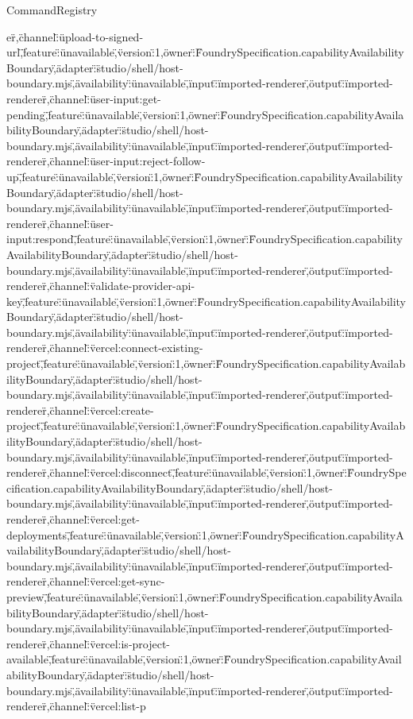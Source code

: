 \begin{lexlean}{CommandRegistry}
\begin{semanticmodule}
{er\"},{\"channel\":\"upload-to-signed-url\",\"feature\":\"unavailable\",\"version\":1,\"owner\":\"FoundrySpecification.capabilityAvailabilityBoundary\",\"adapter\":\"studio/shell/host-boundary.mjs\",\"availability\":\"unavailable\",\"input\":\"imported-renderer\",\"output\":\"imported-renderer\"},{\"channel\":\"user-input:get-pending\",\"feature\":\"unavailable\",\"version\":1,\"owner\":\"FoundrySpecification.capabilityAvailabilityBoundary\",\"adapter\":\"studio/shell/host-boundary.mjs\",\"availability\":\"unavailable\",\"input\":\"imported-renderer\",\"output\":\"imported-renderer\"},{\"channel\":\"user-input:reject-follow-up\",\"feature\":\"unavailable\",\"version\":1,\"owner\":\"FoundrySpecification.capabilityAvailabilityBoundary\",\"adapter\":\"studio/shell/host-boundary.mjs\",\"availability\":\"unavailable\",\"input\":\"imported-renderer\",\"output\":\"imported-renderer\"},{\"channel\":\"user-input:respond\",\"feature\":\"unavailable\",\"version\":1,\"owner\":\"FoundrySpecification.capabilityAvailabilityBoundary\",\"adapter\":\"studio/shell/host-boundary.mjs\",\"availability\":\"unavailable\",\"input\":\"imported-renderer\",\"output\":\"imported-renderer\"},{\"channel\":\"validate-provider-api-key\",\"feature\":\"unavailable\",\"version\":1,\"owner\":\"FoundrySpecification.capabilityAvailabilityBoundary\",\"adapter\":\"studio/shell/host-boundary.mjs\",\"availability\":\"unavailable\",\"input\":\"imported-renderer\",\"output\":\"imported-renderer\"},{\"channel\":\"vercel:connect-existing-project\",\"feature\":\"unavailable\",\"version\":1,\"owner\":\"FoundrySpecification.capabilityAvailabilityBoundary\",\"adapter\":\"studio/shell/host-boundary.mjs\",\"availability\":\"unavailable\",\"input\":\"imported-renderer\",\"output\":\"imported-renderer\"},{\"channel\":\"vercel:create-project\",\"feature\":\"unavailable\",\"version\":1,\"owner\":\"FoundrySpecification.capabilityAvailabilityBoundary\",\"adapter\":\"studio/shell/host-boundary.mjs\",\"availability\":\"unavailable\",\"input\":\"imported-renderer\",\"output\":\"imported-renderer\"},{\"channel\":\"vercel:disconnect\",\"feature\":\"unavailable\",\"version\":1,\"owner\":\"FoundrySpecification.capabilityAvailabilityBoundary\",\"adapter\":\"studio/shell/host-boundary.mjs\",\"availability\":\"unavailable\",\"input\":\"imported-renderer\",\"output\":\"imported-renderer\"},{\"channel\":\"vercel:get-deployments\",\"feature\":\"unavailable\",\"version\":1,\"owner\":\"FoundrySpecification.capabilityAvailabilityBoundary\",\"adapter\":\"studio/shell/host-boundary.mjs\",\"availability\":\"unavailable\",\"input\":\"imported-renderer\",\"output\":\"imported-renderer\"},{\"channel\":\"vercel:get-sync-preview\",\"feature\":\"unavailable\",\"version\":1,\"owner\":\"FoundrySpecification.capabilityAvailabilityBoundary\",\"adapter\":\"studio/shell/host-boundary.mjs\",\"availability\":\"unavailable\",\"input\":\"imported-renderer\",\"output\":\"imported-renderer\"},{\"channel\":\"vercel:is-project-available\",\"feature\":\"unavailable\",\"version\":1,\"owner\":\"FoundrySpecification.capabilityAvailabilityBoundary\",\"adapter\":\"studio/shell/host-boundary.mjs\",\"availability\":\"unavailable\",\"input\":\"imported-renderer\",\"output\":\"imported-renderer\"},{\"channel\":\"vercel:list-p}
\end{semanticmodule}
\end{lexlean}
